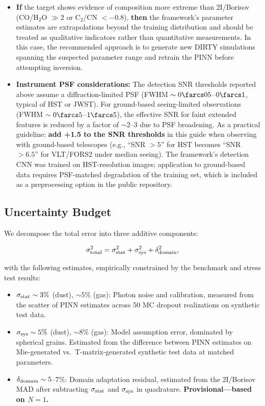 \documentclass[usenatbib]{mnras}
\begin{document}
\begin{itemize}
    \item \textbf{If} the target shows evidence of composition more extreme than 2I/Borisov (CO/H$_2$O $\gg 2$ or C$_2$/CN $<-0.8$), \textbf{then} the framework's parameter estimates are extrapolations beyond the training distribution and should be treated as qualitative indicators rather than quantitative measurements. In this case, the recommended approach is to generate new DIRTY simulations spanning the suspected parameter range and retrain the PINN before attempting inversion.
    \item \textbf{Instrument PSF considerations:} The detection SNR thresholds reported above assume a diffraction-limited PSF (FWHM $\sim 0\farcs05$--$0\farcs1$, typical of HST or JWST). For ground-based seeing-limited observations (FWHM $\sim 0\farcs5$--$1\farcs5$), the effective SNR for faint extended features is reduced by a factor of $\sim$2--3 due to PSF broadening. As a practical guideline: \textbf{add +1.5 to the SNR thresholds} in this guide when observing with ground-based telescopes (e.g., ``SNR $>5$'' for HST becomes ``SNR $>6.5$'' for VLT/FORS2 under median seeing). The framework's detection CNN was trained on HST-resolution images; application to ground-based data requires PSF-matched degradation of the training set, which is included as a preprocessing option in the public repository.
\end{itemize}

\subsection{Uncertainty Budget}\label{sec:uncertainty_budget}

We decompose the total error into three additive components:

\begin{equation}
\sigma_{\rm total}^2 = \sigma_{\rm stat}^2 + \sigma_{\rm sys}^2 + \delta_{\rm domain}^2,
\end{equation}

with the following estimates, empirically constrained by the benchmark and stress test results:

\begin{itemize}
    \item $\sigma_{\rm stat} \sim 3\%$ (dust), $\sim 5\%$ (gas): Photon noise and calibration, measured from the scatter of PINN estimates across 50 MC dropout realizations on synthetic test data.
    \item $\sigma_{\rm sys} \sim 5\%$ (dust), $\sim 8\%$ (gas): Model assumption error, dominated by spherical grains. Estimated from the difference between PINN estimates on Mie-generated vs.\ T-matrix-generated synthetic test data at matched parameters.
    \item $\delta_{\rm domain} \sim 5$--7\%: Domain adaptation residual, estimated from the 2I/Borisov MAD after subtracting $\sigma_{\rm stat}$ and $\sigma_{\rm sys}$ in quadrature. \textbf{Provisional---based on $N=1$.}
\end{itemize}
\end{document}

